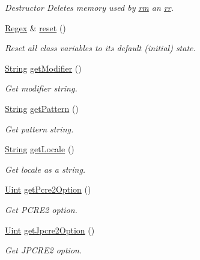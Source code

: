 \begin{DoxyCompactItemize}
\begin{DoxyCompactList}\small\item\em Destructor Deletes memory used by \hyperlink{classjpcre2_1_1Regex_a447925705d222dbbd8c7d60b98cc65f0}{rm} an \hyperlink{classjpcre2_1_1Regex_a5a7ac6c6288988079b8933b4b6637fab}{rr}. \end{DoxyCompactList}\item 
\hyperlink{classjpcre2_1_1Regex}{Regex} \& \hyperlink{classjpcre2_1_1Regex_a91f6afe257e9633cbb79a98649ab8d02}{reset} ()
\begin{DoxyCompactList}\small\item\em Reset all class variables to its default (initial) state. \end{DoxyCompactList}\item 
\hyperlink{namespacejpcre2_a91f03070152fb228bc116c5a737f1d16}{String} \hyperlink{classjpcre2_1_1Regex_acc597ee58b9d5ab35d6e1f98b6118175}{get\+Modifier} ()
\begin{DoxyCompactList}\small\item\em Get modifier string. \end{DoxyCompactList}\item 
\hyperlink{namespacejpcre2_a91f03070152fb228bc116c5a737f1d16}{String} \hyperlink{classjpcre2_1_1Regex_a006dd17f71a2d717aa9575d72fac6d7b}{get\+Pattern} ()
\begin{DoxyCompactList}\small\item\em Get pattern string. \end{DoxyCompactList}\item 
\hyperlink{namespacejpcre2_a91f03070152fb228bc116c5a737f1d16}{String} \hyperlink{classjpcre2_1_1Regex_ae9afaf627ed922a9e4cee8074d30edfa}{get\+Locale} ()
\begin{DoxyCompactList}\small\item\em Get locale as a string. \end{DoxyCompactList}\item 
\hyperlink{namespacejpcre2_a078242d38221a13fb3543b9edd78c099}{Uint} \hyperlink{classjpcre2_1_1Regex_a857307fc59ba7f010b097e61c1744923}{get\+Pcre2\+Option} ()
\begin{DoxyCompactList}\small\item\em Get P\+C\+R\+E2 option. \end{DoxyCompactList}\item 
\hyperlink{namespacejpcre2_a078242d38221a13fb3543b9edd78c099}{Uint} \hyperlink{classjpcre2_1_1Regex_a5d2d04eb7c393338a4c8cce941e957ef}{get\+Jpcre2\+Option} ()
\begin{DoxyCompactList}\small\item\em Get J\+P\+C\+R\+E2 option. \end{DoxyCompactList}\item 

\end{DoxyCompactItemize}
